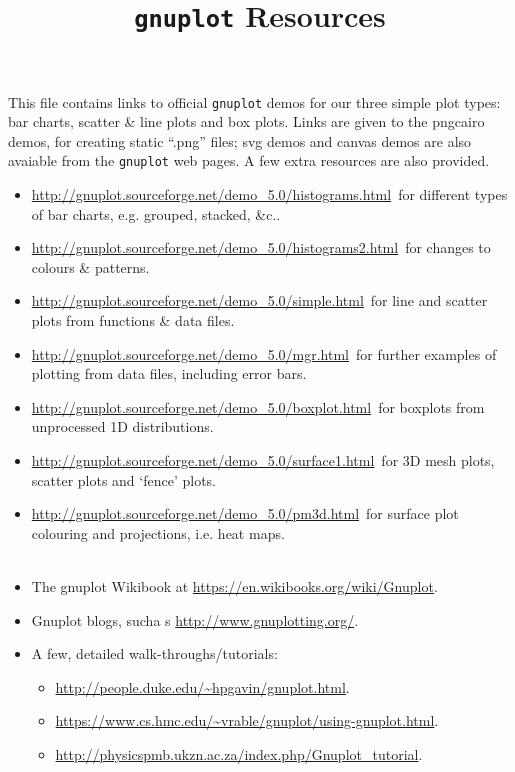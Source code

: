 \documentclass[a4paper]{article}
\title{\texttt{gnuplot} Resources}
\begin{document}
    \maketitle
    This file contains links to official \texttt{gnuplot} demos for our three simple plot types: bar charts, scatter \& line plots and box plots. Links are given to the pngcairo demos, for creating static ``.png'' files; svg demos and canvas demos are also avaiable from the \texttt{gnuplot} web pages. A few extra resources are also provided.\\
    \begin{itemize}
        \item\url{http://gnuplot.sourceforge.net/demo_5.0/histograms.html}\ for different types of bar charts, e.g. grouped, stacked, \&c..\\
        \item\url{http://gnuplot.sourceforge.net/demo_5.0/histograms2.html}\ for changes to colours \& patterns.\\
        \item\url{http://gnuplot.sourceforge.net/demo_5.0/simple.html}\ for line and scatter plots from functions \& data files.\\
        \item\url{http://gnuplot.sourceforge.net/demo_5.0/mgr.html}\ for further examples of plotting from data files, including error bars.\\
        \item\url{http://gnuplot.sourceforge.net/demo_5.0/boxplot.html}\ for boxplots from unprocessed 1D distributions.\\
        \item\url{http://gnuplot.sourceforge.net/demo_5.0/surface1.html}\ for 3D mesh plots, scatter plots and `fence' plots.\\
        \item\url{http://gnuplot.sourceforge.net/demo_5.0/pm3d.html}\ for surface plot colouring and projections, i.e. heat maps.\\
        \\
        \item The gnuplot Wikibook at \url{https://en.wikibooks.org/wiki/Gnuplot}.\\
        \item Gnuplot blogs, sucha s \url{http://www.gnuplotting.org/}.\\
        \item A few, detailed walk-throughs/tutorials:\\
        \begin{itemize}
            \item \url{http://people.duke.edu/~hpgavin/gnuplot.html}.\\
            \item \url{https://www.cs.hmc.edu/~vrable/gnuplot/using-gnuplot.html}.\\
            \item \url{http://physicspmb.ukzn.ac.za/index.php/Gnuplot_tutorial}.\\
        \end{itemize}
    \end{itemize}
\end{document}
